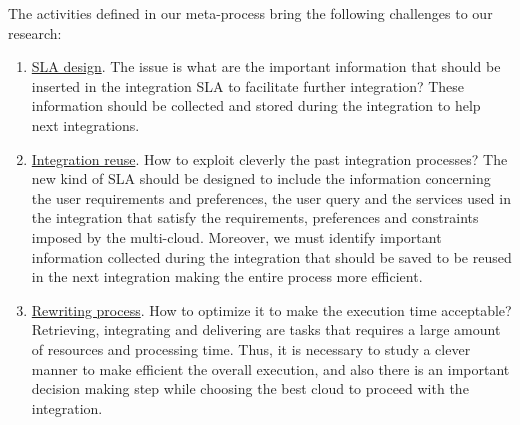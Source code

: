 The activities defined in our meta-process bring the following challenges to our research:
\begin{enumerate}
\item \underline{SLA design}. The issue is what are the important information that should be inserted in the integration SLA to facilitate further integration? These information should be collected and stored during the integration to help next integrations.
\item \underline{Integration reuse}. How  to exploit cleverly the past integration processes? The new kind of SLA should be designed to include the information concerning the user requirements and preferences, the user query and the services used in the integration that satisfy the requirements, preferences and constraints imposed by the multi-cloud. Moreover, we must identify important information collected during the integration that should be saved  to be reused in the next integration making the entire process more efficient. 
\item \underline{Rewriting process}. How to optimize it to make the execution time acceptable? Retrieving, integrating and delivering are tasks that requires a large amount of resources and processing time. Thus, it is necessary to study a clever manner to make efficient the overall execution, and also there is an important decision making step while choosing the best cloud to proceed with the integration.
\end{enumerate}

